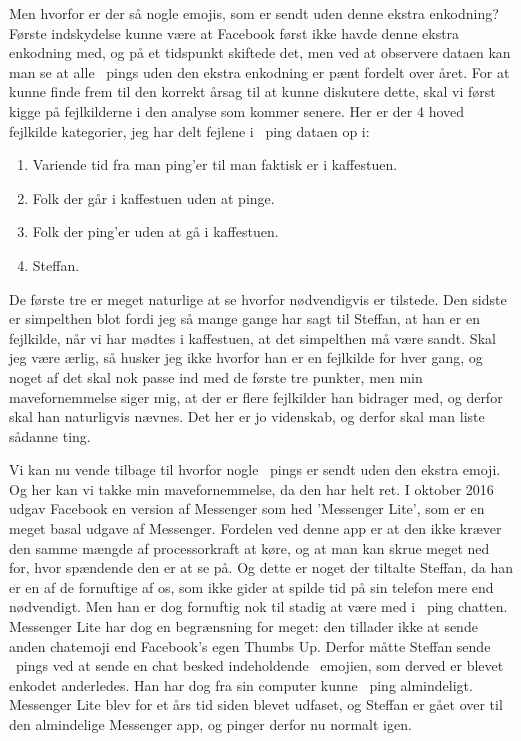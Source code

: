 \begin{article}
Men hvorfor er der så nogle emojis, som er sendt uden denne ekstra enkodning?
Første indskydelse kunne være at Facebook først ikke havde denne ekstra enkodning med, og på et tidspunkt skiftede det, men ved at observere dataen kan man se at alle \coffee\ pings uden den ekstra enkodning er pænt fordelt over året.
For at kunne finde frem til den korrekt årsag til at kunne diskutere dette, skal vi først kigge på fejlkilderne i den analyse som kommer senere. Her er der 4 hoved fejlkilde kategorier, jeg har delt fejlene i \coffee\ ping dataen op i:
\begin{enumerate}[noitemsep]
	\item Variende tid fra man ping'er til man faktisk er i kaffestuen.
	\item Folk der går i kaffestuen uden at pinge.
	\item Folk der ping'er uden at gå i kaffestuen.
	\item Steffan.
\end{enumerate}
De første tre er meget naturlige at se hvorfor nødvendigvis er tilstede. Den sidste er simpelthen blot fordi jeg så mange gange har sagt til Steffan, at han er en fejlkilde, når vi har mødtes i kaffestuen, at det simpelthen må være sandt. Skal jeg være ærlig, så husker jeg ikke hvorfor han er en fejlkilde for hver gang, og noget af det skal nok passe ind med de første tre punkter, men min mavefornemmelse siger mig, at der er flere fejlkilder han bidrager med, og derfor skal han naturligvis nævnes. Det her er jo videnskab, og derfor skal man liste sådanne ting.

Vi kan nu vende tilbage til hvorfor nogle \coffee\ pings er sendt uden den ekstra emoji. Og her kan vi takke min mavefornemmelse, da den har helt ret.
I oktober 2016 udgav Facebook en version af Messenger som hed 'Messenger Lite', som er en meget basal udgave af Messenger. Fordelen ved denne app er at den ikke kræver den samme mængde af processorkraft at køre, og at man kan skrue meget ned for, hvor spændende den er at se på. Og dette er noget der tiltalte Steffan, da han er en af de fornuftige af os, som ikke gider at spilde tid på sin telefon mere end nødvendigt. Men han er dog fornuftig nok til stadig at være med i \coffee\ ping chatten. Messenger Lite har dog en begrænsning for meget: den tillader ikke at sende anden chatemoji end Facebook's egen Thumbs Up. Derfor måtte Steffan sende \coffee\ pings ved at sende en chat besked indeholdende \coffee\ emojien, som derved er blevet enkodet anderledes. Han har dog fra sin computer kunne \coffee\ ping almindeligt.
Messenger Lite blev for et års tid siden blevet udfaset, og Steffan er gået over til den almindelige Messenger app, og pinger derfor nu normalt igen.


\end{article}
